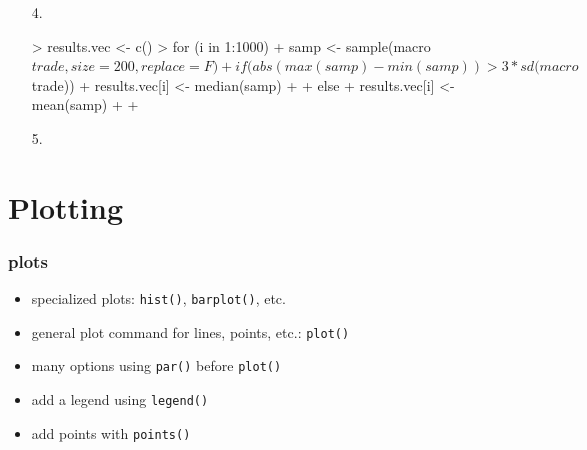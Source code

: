 \documentclass[handout]{beamer}
\newcommand{\red}{\color{red}}
\begin{document}
\begin{frame}[fragile]
\begin{enumerate}
\red
\footnotesize
\item [4.]
\begin{Schunk}
\begin{Sinput}
> results.vec <- c()
> for (i in 1:1000) {
+     samp <- sample(macro$trade, size = 200, replace = F)
+     if (abs(max(samp) - min(samp)) > 3 * sd(macro$trade)) {
+         results.vec[i] <- median(samp)
+     }
+     else {
+         results.vec[i] <- mean(samp)
+     }
+ }
\end{Sinput}
\end{Schunk}
\medskip
\item [5.]
\begin{Schunk}
\end{Schunk}
\end{enumerate}

\end{frame}

\section{Plotting}
\begin{frame}[fragile]
\frametitle{plots}
\begin{itemize}
\item specialized plots: {\tt \red hist()}, {\tt \red barplot()}, etc.
\pause
\item general plot command for lines, points, etc.: {\tt \red plot()}
\pause
\item many options using {\tt \red par()} before {\tt \red plot()} 
\pause
\item add a legend using {\tt \red legend()}
\pause
\item add points with {\tt \red points()}
\end{itemize}
\end{frame}
\end{document}
